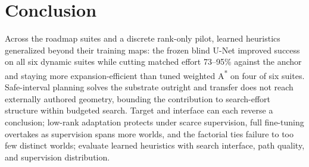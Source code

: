 \documentclass[letterpaper]{article} %
\begin{document}
\section{Conclusion}

Across the roadmap suites and a discrete rank-only pilot, learned heuristics generalized beyond their training maps: the frozen blind U-Net improved success on all six dynamic suites while cutting matched effort 73--95\% against the anchor and staying more expansion-efficient than tuned weighted A\textsuperscript{*} on four of six suites. Safe-interval planning solves the substrate outright and transfer does not reach externally authored geometry, bounding the contribution to search-effort structure within budgeted search. Target and interface can each reverse a conclusion; low-rank adaptation protects under scarce supervision, full fine-tuning overtakes as supervision spans more worlds, and the factorial ties failure to too few distinct worlds; evaluate learned heuristics with search interface, path quality, and supervision distribution.



\end{document}
